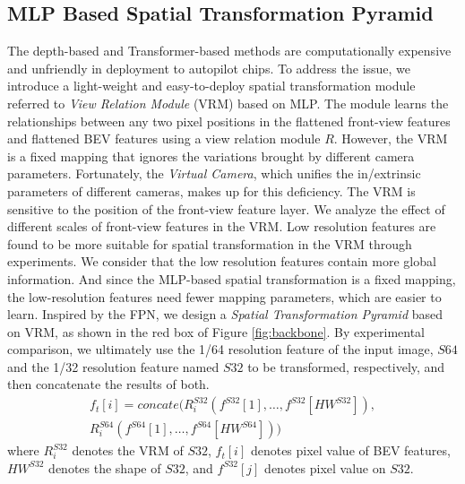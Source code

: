 \documentclass[10pt,twocolumn,letterpaper]{article}
\begin{document}
\subsection{MLP Based Spatial Transformation Pyramid}
The depth-based \cite{philion2020lift,huang2021bevdet} and Transformer-based methods\cite{chen2022persformer,li2022bevformer} are computationally expensive and unfriendly in deployment to autopilot chips. To address the issue, we introduce a light-weight and easy-to-deploy spatial transformation module referred to \textit{View Relation Module} (VRM) \cite{pan2020cross} based on MLP. The module learns the relationships between any two pixel positions in the flattened front-view features and flattened BEV features using a view relation module $R$. However, the VRM is a fixed mapping that ignores the variations brought by different camera parameters. Fortunately, the \textit{Virtual Camera}, which unifies the in/extrinsic parameters of different cameras, makes up for this deficiency. The VRM is sensitive to the position of the front-view feature layer. We analyze the effect of different scales of front-view features in the VRM. Low resolution features are found to be more suitable for spatial transformation in the VRM through experiments. We consider that the low resolution features contain more global information. And since the MLP-based spatial transformation is a fixed mapping, the low-resolution features need fewer mapping parameters, which are easier to learn. Inspired by the FPN\cite{lin2017feature}, we design a \textit{Spatial Transformation Pyramid} based on VRM, as shown in the red box of Figure \ref{fig:backbone}. By experimental comparison, we ultimately use the 1/64 resolution feature of the input image, $S64$ and the 1/32 resolution feature named $S32$ to be transformed, respectively, and then concatenate the results of both.
\begin{equation}
\begin{split}
{f_t}[i] = concate(R_i^{S32}({f^{S32}}[1], \ldots ,{f^{S32}}[H{W^{S32}}]), \\
			  R_i^{S64}({f^{S64}}[1], \ldots ,{f^{S64}}[H{W^{S64}}]))
\end{split}
\end{equation}
where $R_i^{S32}$ denotes the VRM of $S32$, ${f_t}[i]$ denotes pixel value of BEV features, $H{W^{S32}}$ denotes the shape of $S32$, and ${f^{S32}}[j]$ denotes pixel value on $S32$.
\end{document}
